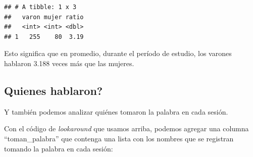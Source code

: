 \documentclass[
]{book}
\newenvironment{Shaded}{\begin{snugshade}}{\end{snugshade}}
\newcommand{\AttributeTok}[1]{\textcolor[rgb]{0.77,0.63,0.00}{#1}}
\newcommand{\FunctionTok}[1]{\textcolor[rgb]{0.00,0.00,0.00}{#1}}
\newcommand{\NormalTok}[1]{#1}
\newcommand{\OtherTok}[1]{\textcolor[rgb]{0.56,0.35,0.01}{#1}}
\newcommand{\SpecialCharTok}[1]{\textcolor[rgb]{0.00,0.00,0.00}{#1}}
\newcommand{\StringTok}[1]{\textcolor[rgb]{0.31,0.60,0.02}{#1}}
\begin{document}
\begin{verbatim}
## # A tibble: 1 x 3
##   varon mujer ratio
##   <int> <int> <dbl>
## 1   255    80  3.19
\end{verbatim}

Esto significa que en promedio, durante el período de estudio, los varones hablaron 3.188 veces más que las mujeres.

\hypertarget{quienes-hablaron}{%
\subsection{Quienes hablaron?}\label{quienes-hablaron}}

Y también podemos analizar quiénes tomaron la palabra en cada sesión.

Con el código de \emph{lookaround} que usamos arriba, podemos agregar una columna ``toman\_palabra'' que contenga una lista con los nombres que se registran tomando la palabra en cada sesión:

\begin{Shaded}
\end{Shaded}
\end{document}
